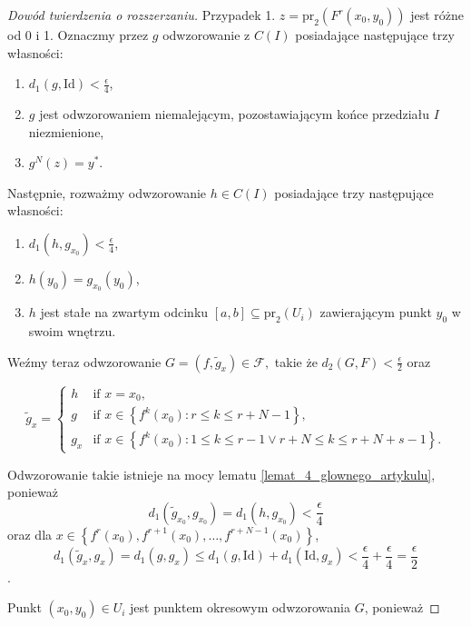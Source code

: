 \documentclass[licencjacka]{pwr_wmat_praca_dyplomowa}
\theoremstyle{plain}
\numberwithin{theorem}{chapter}
\theoremstyle{definition}
\numberwithin{theorem}{chapter}
\begin{document}
\begin{proof}[Dowód twierdzenia o rozszerzaniu]
Przypadek 1. $z = \textrm{pr}_2(F^r(x_0, y_0))$ jest różne od 0 i 1.
Oznaczmy przez $g$ odwzorowanie z $C(I)$ posiadające następujące trzy własności:
\begin{enumerate}[label=(g\arabic*)]
\item \label{g_jeden} $d_1(g, \mathrm{Id}) < \frac{\epsilon}{4}$,
\item \label{g_dwa} $g$ jest odwzorowaniem niemalejącym, pozostawiającym końce przedziału $I$ niezmienione,
\item \label{g_trzy} $g^N(z) = y^*$.
\end{enumerate}

Następnie, rozważmy odwzorowanie $h \in C(I)$ posiadające trzy następujące własności:
\begin{enumerate}[label=(h\arabic*)]
\item \label{h_jeden} $d_1(h, g_{x_0}) < \frac{\epsilon}{4}$,
\item \label{h_dwa} $h(y_0) = g_{x_0}(y_0)$,
\item \label{h_trzy} $h$ jest stałe na zwartym odcinku $[a,b] \subseteq \textrm{pr}_2(U_i)$ zawierającym punkt $y_0$ w swoim wnętrzu.
\end{enumerate}

Weźmy teraz odwzorowanie $G = (f, \widetilde{g}_x) \in \mathcal{F},$ takie że $d_2(G, F) < \frac{\epsilon}{2}$ oraz

\begin{equation}
\label{rownanie_g_z_falka}
    \widetilde{g}_x =
    \begin{cases}
        h & \text{if $x=x_0$,}\\
        g & \text{if $x \in \left\{f^k(x_0) : r \leq k \leq r+N-1\right\}$,}\\
        g_x & \text{if $x \in \left\{f^k(x_0) : 1 \leq k \leq r-1 \lor r+N \leq k \leq r+N+s-1\right\}$.}
    \end{cases}
\end{equation}

Odwzorowanie takie istnieje na mocy lematu \ref{lemat_4_glownego_artykulu}, ponieważ
$$d_1(\widetilde{g}_{x_0}, g_{x_0}) = d_1(h, g_{x_0}) < \frac{\epsilon}{4}$$
oraz dla $x \in \left\{f^r(x_0), f^{r+1}(x_0), \ldots, f^{r+N-1}(x_0)\right\}$,
$$d_1(\widetilde{g}_x, g_x) = d_1(g, g_x) \leq d_1(g, \mathrm{Id}) + d_1(\mathrm{Id}, g_x) < \frac{\epsilon}{4} + \frac{\epsilon}{4} = \frac{\epsilon}{2}$$.

Punkt $(x_0, y_0) \in U_i$ jest punktem okresowym odwzorowania $G$, ponieważ


\end{proof}
\end{document}
